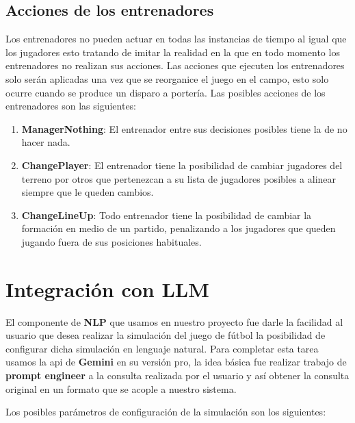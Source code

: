 \documentclass{article}
\begin{document}
\subsection{Acciones de los entrenadores}

Los entrenadores no pueden actuar en todas las instancias de tiempo al igual que los jugadores esto tratando de imitar la realidad
en la que en todo momento los entrenadores no realizan sus acciones. Las acciones que ejecuten los entrenadores solo
serán aplicadas una vez que se reorganice el juego en el campo, esto solo ocurre cuando se produce un disparo a portería.
Las posibles acciones de los entrenadores son las siguientes:

\begin{enumerate}
      \item \textbf{ManagerNothing}: El entrenador entre sus decisiones posibles tiene la de no hacer nada.
            
      \item \textbf{ChangePlayer}: El entrenador tiene la posibilidad de cambiar jugadores del terreno por otros que pertenezcan a su lista de jugadores posibles a alinear siempre que le queden cambios.
            
      \item \textbf{ChangeLineUp}: Todo entrenador tiene la posibilidad de cambiar la formación en medio de un partido, penalizando a los jugadores que queden jugando fuera de sus posiciones habituales.
            
\end{enumerate}


\section{Integración con LLM}

El componente de \textbf{NLP} que usamos en nuestro proyecto fue darle la facilidad al usuario que desea realizar la simulación del 
juego de fútbol la posibilidad de configurar dicha simulación en lenguaje natural. Para completar esta tarea usamos la api de \textbf{Gemini}
en su versión pro, la idea básica fue realizar trabajo de \textbf{prompt engineer} a la consulta realizada por el usuario y así obtener
la consulta original en un formato que se acople a nuestro sistema.

Los posibles parámetros de configuración de la simulación son los siguientes:
\end{document}
